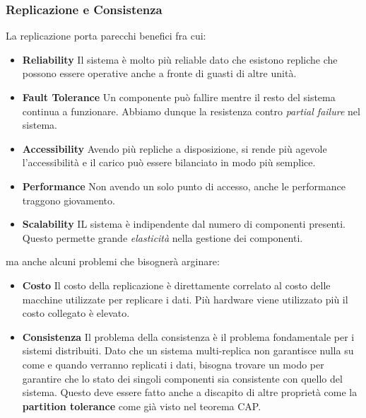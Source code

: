 		\subsubsection{Replicazione e Consistenza}
		La replicazione porta parecchi benefici fra cui:
		\begin{itemize}
			\item{\textbf{Reliability}}
			Il sistema è molto più reliable dato che esistono repliche che possono essere operative anche a fronte di guasti di altre unità.
			\item{\textbf{Fault Tolerance}}
			Un componente può fallire mentre il resto del sistema continua a funzionare. Abbiamo dunque la resistenza contro \textit{partial failure} nel sistema.
			\item{\textbf{Accessibility}}
			Avendo più repliche a disposizione, si rende più agevole l'accessibilità e il carico può essere bilanciato in modo più semplice.
			\item{\textbf{Performance}}
			Non avendo un solo punto di accesso, anche le performance traggono giovamento.
			\item{\textbf{Scalability}}
			IL sistema è indipendente dal numero di componenti presenti. Questo permette grande \textit{elasticità} nella gestione dei componenti.
		\end{itemize}
		ma anche alcuni problemi che bisognerà arginare:
		\begin{itemize}
			\item{\textbf{Costo}}
			Il costo della replicazione è direttamente correlato al costo delle macchine utilizzate per replicare i dati. Più hardware viene utilizzato più il costo collegato è elevato.
			\item{\textbf{Consistenza}}
			Il problema della consistenza è il problema fondamentale per i sistemi distribuiti. Dato che un sistema multi-replica non garantisce nulla su come e quando verranno replicati i dati, bisogna trovare un modo per garantire che lo stato dei singoli componenti sia consistente con quello del sistema. Questo deve essere fatto anche a discapito di altre proprietà come la \textbf{partition tolerance} come già visto nel teorema CAP. 
		\end{itemize}


